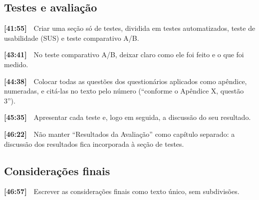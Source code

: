 \documentclass[11pt,a4paper]{article}
\newcommand{\tm}[1]{\textbf{[#1]}\ \ }
\begin{document}
\subsection*{Testes e avaliação}
\begin{checklist}
  \item \tm{41:55}Criar uma seção só de testes, dividida em testes automatizados, teste de usabilidade (SUS) e teste comparativo A/B.
  \item \tm{43:41}No teste comparativo A/B, deixar claro como ele foi feito e o que foi medido.
  \item \tm{44:38}Colocar todas as questões dos questionários aplicados como apêndice, numeradas, e citá-las no texto pelo número (“conforme o Apêndice X, questão 3”).
  \item \tm{45:35}Apresentar cada teste e, logo em seguida, a discussão do seu resultado.
  \item \tm{46:22}Não manter “Resultados da Avaliação” como capítulo separado: a discussão dos resultados fica incorporada à seção de testes.
\end{checklist}
\subsection*{Considerações finais}
\begin{checklist}
  \item \tm{46:57}Escrever as considerações finais como texto único, sem subdivisões.
\end{checklist}
\end{document}

